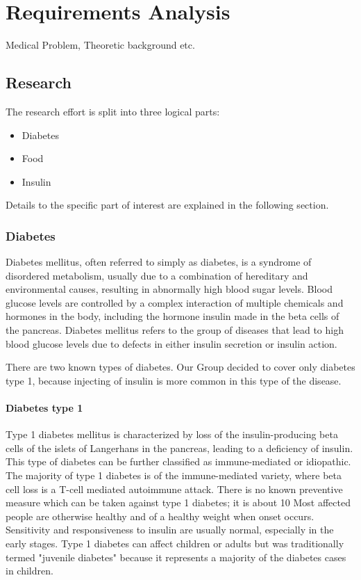 \section{Requirements Analysis}
Medical Problem, Theoretic background etc.

\subsection{Research}
The research effort is split into three logical parts:
\begin{itemize}
  \item Diabetes
  \item Food
  \item Insulin
\end{itemize}
Details to the specific part of interest are explained in the following section.

\subsubsection{Diabetes}
Diabetes mellitus, often referred to simply as diabetes, is a syndrome of disordered metabolism, 
usually due to a combination of hereditary and environmental causes, resulting in abnormally high blood sugar levels. 
Blood glucose levels are controlled by a complex interaction of multiple chemicals and hormones in the body, 
including the hormone insulin made in the beta cells of the pancreas. Diabetes mellitus refers to the group of diseases 
that lead to high blood glucose levels due to defects in either insulin secretion or insulin action.

There are two known types of diabetes. Our Group decided to cover only diabetes type 1, because injecting of insulin is more common
in this type of the disease.

\paragraph{Diabetes type 1}
Type 1 diabetes mellitus is characterized by loss of the insulin-producing beta cells of the islets of Langerhans in the pancreas, leading to a deficiency of insulin. 
This type of diabetes can be further classified as immune-mediated or idiopathic. The majority of type 1 diabetes is of the immune-mediated variety, where beta cell loss is a T-cell mediated autoimmune attack.
There is no known preventive measure which can be taken against type 1 diabetes; it is about 10%
Most affected people are otherwise healthy and of a healthy weight when onset occurs. Sensitivity and responsiveness to insulin are usually normal, especially in the early stages. 
Type 1 diabetes can affect children or adults but was traditionally termed "juvenile diabetes" because it represents a majority of the diabetes cases in children.

